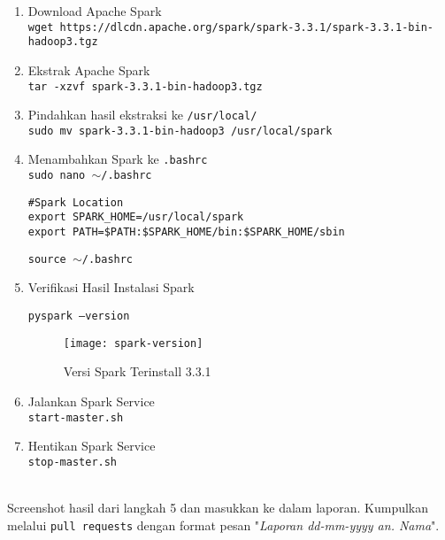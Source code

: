\documentclass[a4paper]{tufte-handout}
\begin{document}
\begin{enumerate}
\item Download Apache Spark \\
{\tt \footnotesize{wget https://dlcdn.apache.org/spark/spark-3.3.1/spark-3.3.1-bin-hadoop3.tgz}}

\item Ekstrak Apache Spark \\
{\tt tar -xzvf spark-3.3.1-bin-hadoop3.tgz}

\item Pindahkan hasil ekstraksi ke {\tt /usr/local/} \\
{\tt sudo mv spark-3.3.1-bin-hadoop3 /usr/local/spark}

\item Menambahkan Spark ke {\tt .bashrc} \\
{\tt sudo nano $\sim$/.bashrc}
\begin{lstlisting}
#Spark Location
export SPARK_HOME=/usr/local/spark
export PATH=$PATH:$SPARK_HOME/bin:$SPARK_HOME/sbin
\end{lstlisting}
{\tt source $\sim$/.bashrc}

\item Verifikasi Hasil Instalasi Spark

{\tt pyspark ---version}

\begin{figure}[!ht]
\texttt{[image: spark-version]}
\caption{Versi Spark Terinstall 3.3.1 }
\label{gam:form-ssh}
\end{figure}

\item Jalankan Spark Service \\
{\tt start-master.sh}

\item Hentikan Spark Service \\
{\tt stop-master.sh}
\end{enumerate}

 \\
Screenshot hasil dari langkah 5 dan masukkan ke dalam laporan. Kumpulkan melalui {\tt pull requests} dengan format pesan "\textit{Laporan dd-mm-yyyy an. Nama}".

\hrulefill
\end{document}
